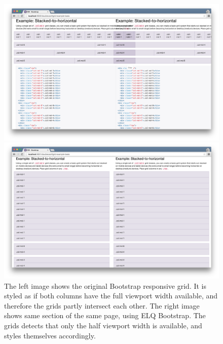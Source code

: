 \documentclass[a4paper,11pt]{kth-mag}
\begin{document}
      \begin{figure}[htb!]
        \centering
        \begin{minipage}{.5\textwidth}
          \centering
          \includegraphics[width=\linewidth]{images/bootstrap-mq-grid}
        \end{minipage}%
        \begin{minipage}{.5\textwidth}
          \centering
          \includegraphics[width=\linewidth]{images/bootstrap-eq-grid}
        \end{minipage}
        \caption{
          The left image shows the original Bootstrap responsive grid.
          It is styled as if both columns have the full viewport width available, and therefore the grids partly intersect each other.
          The right image shows same section of the same page, using \gls{ELQ} Bootstrap.
          The grids detects that only the half viewport width is available, and styles themselves accordingly.
        }
        \label{fig:eval-bootstrap-mq-eq-grid}
      \end{figure}
\end{document}
